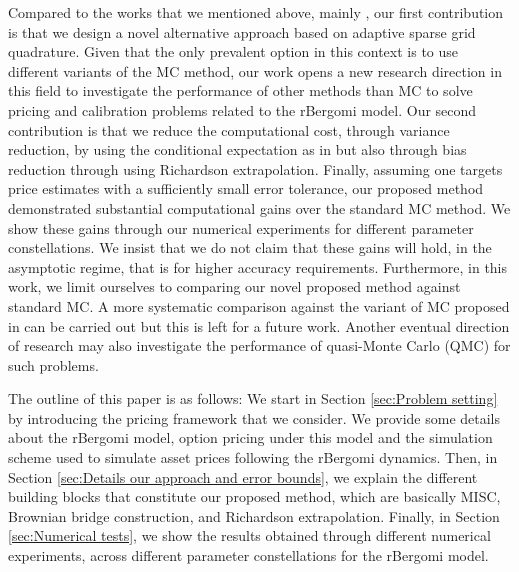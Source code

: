 Compared to the works that we mentioned above, mainly \cite{mccrickerd2017turbocharging}, our first contribution is that we design a novel alternative approach based on adaptive sparse grid quadrature. Given that the only prevalent option in this context is to use different variants of the MC method, our work opens a new  research direction in this field to investigate the performance of other methods than MC to solve pricing and calibration problems related to the rBergomi model. Our second contribution is that we reduce the computational cost, through variance reduction,  by using the conditional expectation as in \cite{mccrickerd2017turbocharging} but also through bias reduction through using Richardson extrapolation. Finally, assuming one targets price estimates with a sufficiently small  error tolerance, our proposed method demonstrated substantial computational gains  over the standard MC method. We show  these gains through our numerical experiments for  different parameter constellations. We insist that we do not claim that these gains will hold, in the asymptotic regime, that is for higher accuracy requirements. Furthermore,  in this work, we limit ourselves to comparing our novel proposed method against standard MC. A more systematic comparison against the variant of MC proposed in \cite{mccrickerd2017turbocharging}  can be carried out but this is left for a future work. Another eventual direction of research may also investigate the performance of quasi-Monte Carlo (QMC) for such problems.


The outline of this paper is as follows: We start in Section \ref{sec:Problem setting} by  introducing  the pricing framework that we consider. We provide some details about the rBergomi model, option pricing under this model and the simulation scheme used to simulate asset prices following the rBergomi dynamics. Then, in Section \ref{sec:Details our approach and error bounds}, we explain the different building blocks that constitute our proposed method, which are basically MISC, Brownian bridge construction, and Richardson extrapolation. Finally, in Section \ref{sec:Numerical tests}, we show the results obtained through different numerical experiments, across different parameter constellations for the rBergomi model. 


